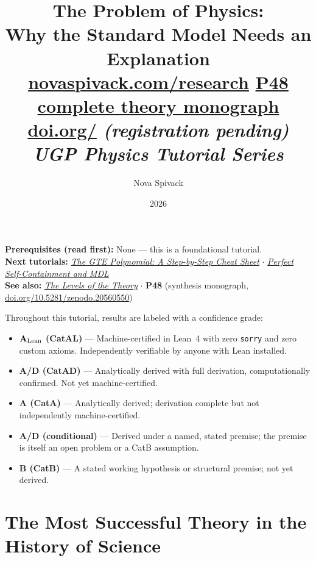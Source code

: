 \documentclass[11pt,a4paper]{article}
\date{2026}
\title{\textbf{The Problem of Physics:}\\[6pt]
\large Why the Standard Model Needs an Explanation\\[8pt]
\normalsize
\href{https://novaspivack.com/research}{novaspivack.com/research}\quad
\href{https://doi.org/10.5281/zenodo.20560550}{P48 complete theory monograph}\\[4pt]
\small\href{https://doi.org/\TutorialDOI}{doi.org/\TutorialDOI}
  \textit{(registration pending)}\\[4pt]
\normalsize\textit{UGP Physics Tutorial Series}}
\author{Nova Spivack}
\begin{document}
\setcounter{tocdepth}{2}
\maketitle
\tableofcontents
\newpage

\begin{tcolorbox}[colback=blue!6,colframe=blue!40!black,
  title=\textbf{UGP Physics Tutorial Series}]
\textbf{Prerequisites (read first):} None --- this is a foundational tutorial.\\[4pt]
\textbf{Next tutorials:}
  \href{https://doi.org/10.5281/zenodo.20657889}{\emph{The GTE Polynomial: A Step-by-Step Cheat Sheet}}
  $\cdot$
  \href{https://doi.org/10.5281/zenodo.20657895}{\emph{Perfect Self-Containment and MDL}}\\[4pt]
\textbf{See also:}
  \href{https://doi.org/10.5281/zenodo.20657872}{\emph{The Levels of the Theory}}
  $\cdot$
  \textbf{P48} (synthesis monograph,
  \href{https://doi.org/10.5281/zenodo.20560550}{doi.org/10.5281/zenodo.20560550})
\end{tcolorbox}

\begin{tcolorbox}[colback=boxgreen,colframe=green!50!black,
  title=\textbf{Claim-Strength Taxonomy}]
Throughout this tutorial, results are labeled with a confidence grade:
\begin{itemize}[itemsep=2pt]
  \item \textbf{$\mathbf{A}_{\rm Lean}$ (CatAL)} --- Machine-certified in Lean~4 with zero \texttt{sorry} and zero custom axioms.  Independently verifiable by anyone with Lean installed.
  \item \textbf{A/D (CatAD)} --- Analytically derived with full derivation, computationally confirmed.  Not yet machine-certified.
  \item \textbf{A (CatA)} --- Analytically derived; derivation complete but not independently machine-certified.
  \item \textbf{A/D (conditional)} --- Derived under a named, stated premise; the premise is itself an open problem or a CatB assumption.
  \item \textbf{B (CatB)} --- A stated working hypothesis or structural premise; not yet derived.
\end{itemize}
\end{tcolorbox}

\section{The Most Successful Theory in the History of Science}
\label{sec:success}
\end{document}
